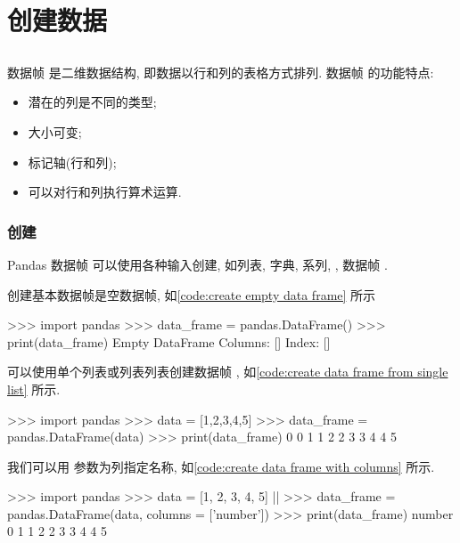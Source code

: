 \section{创建数据}
\subsection[DataFrame]{}
数据帧  是二维数据结构, 即数据以行和列的表格方式排列. 数据帧  的功能特点:%
%
\begin{itemize}
    \item 潜在的列是不同的类型;
    \item 大小可变;
    \item 标记轴(行和列);
    \item 可以对行和列执行算术运算.
\end{itemize}

\subsubsection{创建}
Pandas 数据帧  可以使用各种输入创建, 如列表, 字典, 系列, , 数据帧 .

创建基本数据帧是空数据帧, 如\cref{code:create empty data frame} 所示%
%
\begin{codebox}[
  label = code:create empty data frame,
  caption = 创建一个空的 \inlinetext{DataFrame}
]
>>> import pandas
>>> data_frame = pandas.DataFrame()
>>> print(data_frame)
Empty DataFrame
Columns: []
Index: []
\end{codebox}

可以使用单个列表或列表列表创建数据帧 , 如\cref{code:create data frame from single list} 所示.%
%
\begin{codebox}[
  label = code:create data frame from single list,
  caption = 用单个列表创建 \inlinetext{DataFrame}
]
>>> import pandas
>>> data = [1,2,3,4,5]
>>> data_frame = pandas.DataFrame(data)
>>> print(data_frame)
   0
0  1
1  2
2  3
3  4
4  5
\end{codebox}

我们可以用  参数为列指定名称, 如\cref{code:create data frame with columns} 所示.%
%
\begin{codebox}[
  label = code:create data frame with columns,
  caption = 用 \inlinetext{columns} 参数为列指定名称
]
>>> import pandas
>>> data = [1, 2, 3, 4, 5] |\label{line:initialization}|
>>> data_frame = pandas.DataFrame(data, columns = ['number'])
>>> print(data_frame)
   number
0       1
1       2
2       3
3       4
4       5
\end{codebox}

